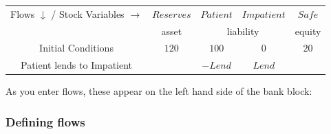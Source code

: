 \begin{center}
\begin{tabular}{|c|cccc|}
\hline
Flows $\downarrow$ / Stock Variables $\rightarrow$&\multicolumn{1}{|c|}{$Reserves$}&\multicolumn{1}{|c|}{$Patient$}&\multicolumn{1}{|c|}{$Impatient$}&\multicolumn{1}{|c|}{$Safe$}\\\cline{2-5}&\multicolumn{1}{|c|}{asset}&\multicolumn{2}{|c|}{liability}&\multicolumn{1}{|c|}{equity}\\\hline
Initial Conditions&$120$&$100$&$0$&$20$\\
Patient lends to Impatient&&$-Lend$&$Lend$&\\
\hline
\end{tabular}
\end{center}

As you enter flows, these appear on the left hand side of the bank block:

\begin{center}
\end{center}

\subsubsection{Defining flows}

